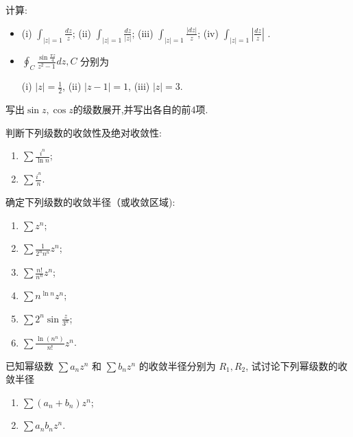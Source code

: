 \documentclass[10pt]{article}
\newenvironment{problem}[2][]{\begin{trivlist}
\item[\hskip \labelsep {\bfseries #1}\hskip \labelsep {\bfseries #2}]}{\end{trivlist}}
\begin{document}
  
\begin{problem}{4.5}
  计算:
  \begin{itemize}
    \item 
    (i) $\int_{|z|=1} \frac{d z}{z}$;
    (ii) $\int_{|z|=1} \frac{d z}{|z|}$;
    (iii) $\int_{|z|=1} \frac{|d z|}{z}$;
    (iv) $\int_{|z|=1}\left|\frac{d z}{z}\right|$ .

    \item  $\oint_C \frac{\sin \frac{\pi z}{4}}{z^2-1} d z, C$ 分别为

    (i) $|z|=\frac{1}{2}$,
    (ii) $|z-1|=1$,
    (iii) $|z|=3$.
    
  \end{itemize}

\end{problem}


\begin{problem}{4.6}
  写出$\sin{z},\cos{z}$的级数展开,并写出各自的前4项.
  \end{problem}
  



\begin{problem}{4.7}
  判断下列级数的收敛性及绝对收敛性:
  \begin{enumerate}
    \item $\sum \frac{i^n}{\ln n}$;
    \item $\sum \frac{i^n}{n}$.
  \end{enumerate}
\end{problem}

\begin{problem}{4.8}
  确定下列级数的收敛半径（或收敛区域):
  \begin{enumerate}
    \item $\sum z^n$;
    \item $\sum \frac{1}{2^n n^n} z^n$;
    \item $\sum \frac{n !}{n^n} z^n$;
    \item $\sum n^{\ln{n}} z^n$;
    \item $\sum 2^n \sin \frac{z}{3^n}$;
    \item $\sum \frac{\ln \left(n^n\right)}{n !} z^n$.
  \end{enumerate}

\end{problem}


\begin{problem}{4.9}
  已知幂级数 $\sum a_n z^n$ 和 $\sum b_n z^n$ 的收敛半径分别为 $R_1, R_2$, 
  试讨论下列幂级数的收敛半径
  \begin{enumerate}
    \item $\sum\left(a_n+b_n\right) z^n$;
    \item $\sum a_n b_n z^n$.
  \end{enumerate}
\end{problem}
\end{document}
